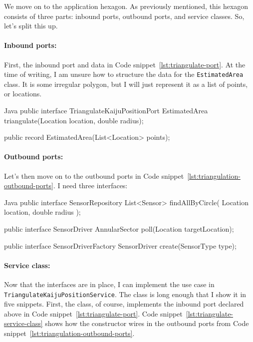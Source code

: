 We move on to the application hexagon. As previously mentioned, this hexagon consists of three parts: inbound ports, outbound ports, and service classes. So, let's split this up.

\paragraph{Inbound ports:}

First, the inbound port and data in Code snippet~\ref{lst:triangulate-port}. At the time of writing, I am unsure how to structure the data for the \texttt{EstimatedArea} class. It is some irregular polygon, but I will just represent it as a list of points, or locations.

\begin{ridercode}{Java}
public interface TriangulateKaijuPositionPort
{
    EstimatedArea triangulate(Location location, double radius);
}

public record EstimatedArea(List<Location> points);
\end{ridercode}
\label{lst:triangulate-port}


\paragraph{Outbound ports:}
Let's then move on to the outbound ports in Code snippet~\ref{lst:triangulation-outbound-ports}. I need three interfaces:

\begin{ridercode}{Java}
public interface SensorRepository
{
    List<Sensor> findAllByCircle(
        Location location,
        double radius
    );
}

public interface SensorDriver
{
    AnnularSector poll(Location targetLocation);
}

public interface SensorDriverFactory
{
    SensorDriver create(SensorType type);
}

\end{ridercode}
\label{lst:triangulation-outbound-ports}

\paragraph{Service class:}

Now that the interfaces are in place, I can implement the use case in \texttt{TriangulateKaijuPositionService}. The class is long enough that I show it in five snippets. First, the class, of course, implements the inbound port declared above in Code snippet~\ref{lst:triangulate-port}.
Code snippet~\ref{lst:triangulate-service-class} shows how the constructor wires in the outbound ports from Code snippet~\ref{lst:triangulation-outbound-ports}.

